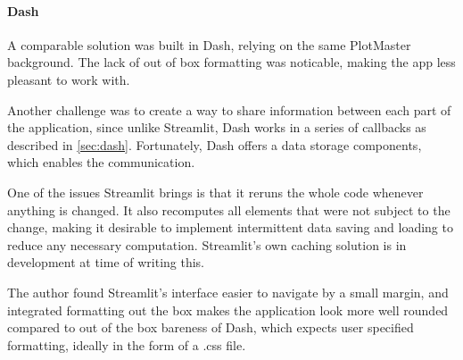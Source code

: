\paragraph{Dash}
\label{sec:dash3}
A comparable solution was built in Dash, relying on the same PlotMaster background. The lack of out of box formatting was noticable, making the app less pleasant to work with. 

Another challenge was to create a way to share information between each part of the application, since unlike Streamlit, Dash works in a series of callbacks as described in \ref{sec:dash}. Fortunately, Dash offers a data storage components, which enables the communication. 

One of the issues Streamlit brings is that it reruns the whole code whenever anything is changed. It also recomputes all elements that were not subject to the change, making it desirable to implement intermittent data saving and loading to reduce any necessary computation. Streamlit's own caching solution is in development at time of writing this. 

The author found Streamlit's interface easier to navigate by a small margin, and integrated formatting out the box makes the application look more well rounded compared to out of the box bareness of Dash, which expects user specified formatting, ideally in the form of a .css file.

